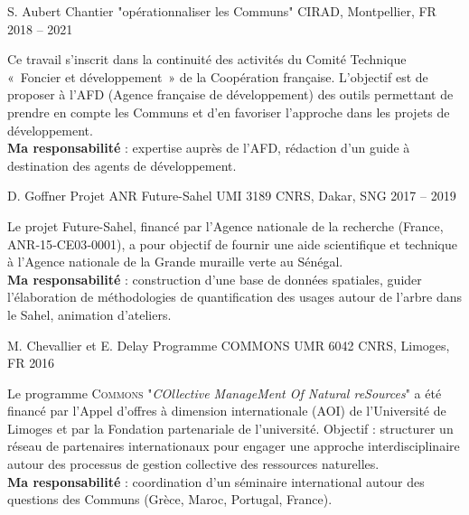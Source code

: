 \begin{cventries}
  \cventry
  {S. Aubert} %
  {Chantier "opérationnaliser les Communs"} %
  {CIRAD, Montpellier, FR} %
  {2018 -- 2021} %
  {
    \begin{cvitems} %
      Ce travail s’inscrit dans la continuité des activités du Comité Technique « Foncier et développement » de la Coopération française. L’objectif est de proposer à l’AFD (Agence française de développement) des outils permettant de prendre en compte les Communs et d’en favoriser l’approche dans les projets de développement.\\
      \textbf{Ma responsabilité} : expertise auprès de l'AFD, rédaction d'un guide à destination des agents de développement.
    \end{cvitems}
  }

  \cventry
  {D. Goffner} %
  {Projet ANR Future-Sahel} %
  {UMI 3189 CNRS, Dakar, SNG} %
  {2017 -- 2019} %
  {
    \begin{cvitems} %
    Le projet Future-Sahel, financé par l’Agence nationale de la recherche (France, ANR‑15‑CE03‑0001), a pour objectif de fournir une aide scientifique et technique à l’Agence nationale de la Grande muraille verte au Sénégal.\\
    \textbf{Ma responsabilité} : construction d’une base de données spatiales, guider l'élaboration de méthodologies de quantification des usages autour de l’arbre dans le Sahel, animation d’ateliers.
    \end{cvitems}
  }

  \cventry
  {M. Chevallier et E. Delay} %
  {Programme COMMONS} %
  {UMR 6042 CNRS, Limoges, FR} %
  {2016} %
  {
    \begin{cvitems} %
      Le programme \textsc{Commons} "\textit{COllective ManageMent Of Natural reSources}" a été financé par l’Appel d’offres à dimension internationale (AOI) de l’Université de Limoges et par la Fondation partenariale de l’université. Objectif : structurer un réseau de partenaires internationaux pour engager une approche interdisciplinaire autour des processus de gestion collective des ressources naturelles.\\
      \textbf{Ma responsabilité} : coordination d'un séminaire international autour des questions des Communs (Grèce, Maroc, Portugal, France).
    \end{cvitems}
  }


\end{cventries}
